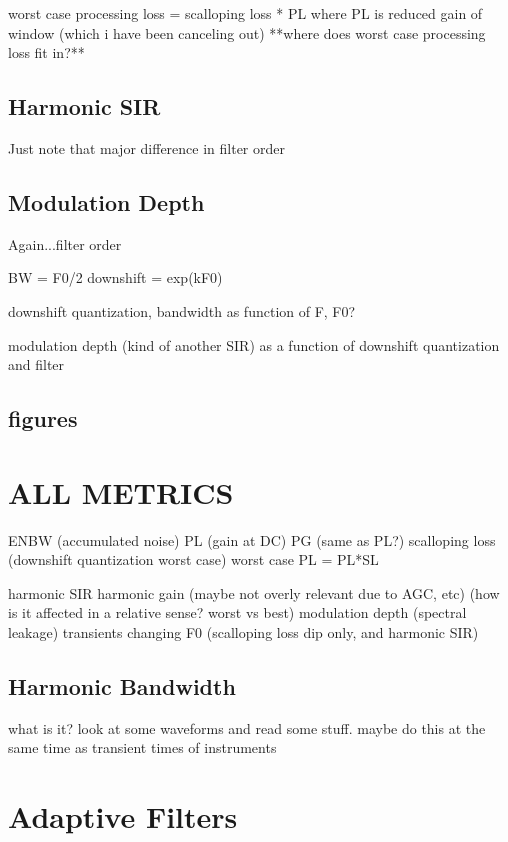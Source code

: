 \documentclass [11pt, proquest] {uwthesis}[2015/03/03]
\begin{document}
worst case processing loss = scalloping loss * PL
where PL is reduced gain of window (which i have been canceling out)
**where does worst case processing loss fit in?**

\subsection{Harmonic SIR}

Just note that major difference in filter order

\subsection{Modulation Depth}

Again...filter order

BW = F0/2
downshift = exp(kF0)

downshift quantization, bandwidth as function of F, F0?

modulation depth (kind of another SIR) as a function of downshift quantization and filter

\subsection{figures}

\section{ALL METRICS}

ENBW (accumulated noise)
PL (gain at DC)
PG (same as PL?)
scalloping loss (downshift quantization worst case)
worst case PL = PL*SL

harmonic SIR
harmonic gain (maybe not overly relevant due to AGC, etc)
					(how is it affected in a relative sense? worst vs best)
modulation depth (spectral leakage)
transients
changing F0 (scalloping loss dip only, and harmonic SIR)

\subsection{Harmonic Bandwidth}

what is it?  look at some waveforms and read some stuff.  maybe do this at the same time as transient times of instruments

\section{Adaptive Filters}
\end{document}
